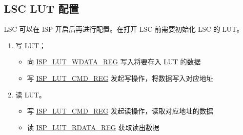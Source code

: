 \documentclass[main\_\_CN.tex]{subfiles}
\begin{document}
\subsection{LSC LUT 配置}
LSC 可以在 ISP 开启后再进行配置。在打开 LSC 前需要初始化 LSC 的 LUT。
\begin{enumerate}
    \item 写 LUT；
    \begin{itemize}
        \item 向 \hyperref[regdesc:ISPLUTWDATAREG]{ISP\_LUT\_WDATA\_REG} 写入将要存入 LUT 的数据
        \item 写 \hyperref[regdesc:ISPLUTCMDREG]{ISP\_LUT\_CMD\_REG} 发起写操作，将数据写入对应地址
\end{itemize}

    \item 读 LUT。
    \begin{itemize}
        \item 写 \hyperref[regdesc:ISPLUTCMDREG]{ISP\_LUT\_CMD\_REG} 发起读操作，读取对应地址的数据
        \item 读 \hyperref[regdesc:ISPLUTRDATAREG]{ISP\_LUT\_RDATA\_REG} 获取读出数据
    \end{itemize}
\end{enumerate}
\end{document}
